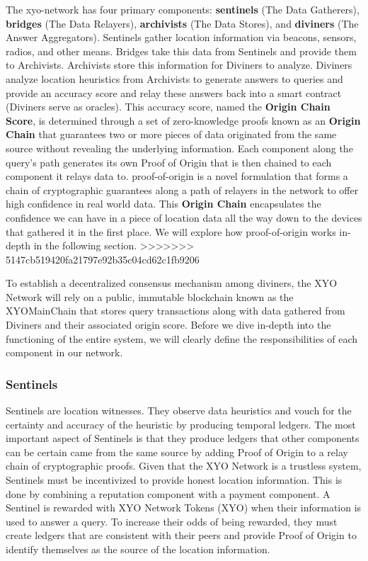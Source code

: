 \documentclass{article}
\begin{document}
The \Gls{xyo-network} has four primary components: \textbf{\Glspl{sentinel}} (The Data Gatherers), \textbf{\Glspl{bridge}} (The Data Relayers), \textbf{\Glspl{archivist}} (The Data Stores), and \textbf{\Glspl{diviner}} (The Answer Aggregators). Sentinels gather location information via beacons, sensors, radios, and other means. Bridges take this data from Sentinels and provide them to Archivists. Archivists store this information for Diviners to analyze. Diviners analyze location heuristics from Archivists to generate answers to queries and provide an accuracy score and relay these answers back into a smart contract (Diviners serve as oracles). This accuracy score, named the \textbf{Origin Chain Score}, is determined through a set of zero-knowledge proofs known as an \textbf{Origin Chain} that guarantees two or more pieces of data originated from the same source without revealing the underlying information. Each component along the query's path generates its own Proof of Origin that is then chained to each component it relays data to. \Gls{proof-of-origin} is a novel formulation that forms a chain of cryptographic guarantees along a path of relayers in the network to offer high confidence in real world data. This \textbf{Origin Chain} encapsulates the confidence we can have in a piece of location data all the way down to the devices that gathered it in the first place. We will explore how \Gls{proof-of-origin} works in-depth in the following section.
>>>>>>> 5147cb519420fa21797e92b35c04cd62c1fb9206

To establish a decentralized consensus mechanism among diviners, the XYO Network will rely on a public, immutable blockchain known as the XYOMainChain that stores query transactions along with data gathered from Diviners and their associated origin score. Before we dive in-depth into the functioning of the entire system, we will clearly define the responsibilities of each component in our network.

\subsubsection{Sentinels}

Sentinels are location witnesses. They observe data heuristics and vouch for the certainty and accuracy of the heuristic by producing temporal ledgers. The most important aspect of Sentinels is that they produce ledgers that other components can be certain came from the same source by adding Proof of Origin to a relay chain of cryptographic proofs. Given that the XYO Network is a trustless system, Sentinels must be incentivized to provide honest location information. This is done by combining a reputation component with a payment component. A Sentinel is rewarded with XYO Network Tokens (XYO) when their information is used to answer a query. To increase their odds of being rewarded, they must create ledgers that are consistent with their peers and provide Proof of Origin to identify themselves as the source of the location information.
\end{document}
